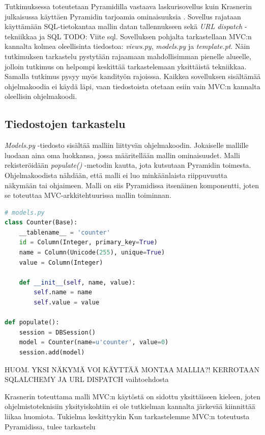 \documentclass[finnish,utf8,nonumbib,palatino,kandi]{gradu2}
\begin{document}
Tutkimuksessa toteutetaan Pyramidilla vastaava laskurisovellus kuin Krasnerin julkaisussa käyttäen Pyramidin tarjoamia ominaisuuksia \cite{Krasner:desc}. Sovellus rajataan käyttämään SQL-tietokantaa mallin datan tallennukseen sekä \emph{URL dispatch} -tekniikkaa \cite{urldispatch} ja SQL TODO: Viite sql. Sovelluksen pohjalta tarkastellaan MVC:n kannalta kolmea oleellisinta tiedostoa: \emph{views.py}, \emph{models.py} ja \emph{template.pt}. Näin tutkimuksen tarkastelu pystytään rajaamaan mahdollisimman pienelle alueelle, jolloin tutkimus on helpompi keskittää tarkastelemaan yksittäistä tekniikkaa. Samalla tutkimus pysyy myös kandityön rajoisssa. Kaikkea sovelluksen sisältämää ohjelmakoodia ei käydä läpi, vaan tiedostoista otetaan esiin vain MVC:n kannalta oleellisin ohjelmakoodi. 


\subsection{Tiedostojen tarkastelu}

\emph{Models.py} -tiedosto sisältää malliin liittyvän ohjelmakoodin. Jokaiselle mallille luodaan aina oma luokkansa, jossa määritellään mallin ominaisuudet. Malli rekisteröidään \emph{populate()} -metodin kautta, jota kutsutaan Pyramidin toimesta.
Ohjelmakoodista nähdään, että malli ei luo minkäänlaista riippuvuutta näkymään tai ohjaimeen. Malli on siis Pyramidissa itsenäinen komponentti, joten se toteuttaa MVC-arkkitehtuurissa
mallin toiminnan. 
\begin{lstlisting}[language=Python]
# models.py
class Counter(Base):
    __tablename__ = 'counter'
    id = Column(Integer, primary_key=True)
    name = Column(Unicode(255), unique=True)
    value = Column(Integer)

    def __init__(self, name, value):
        self.name = name
        self.value = value

def populate():
    session = DBSession()
    model = Counter(name=u'counter', value=0)
    session.add(model)
\end{lstlisting} 


HUOM. YKSI NÄKYMÄ VOI KÄYTTÄÄ MONTAA MALLIA?!
KERROTAAN SQLALCHEMY JA URL DISPATCH vaihtoehdosta

 Krasnerin toteuttama malli MVC:n käytöstä on sidottu yksittäiseen kieleen, joten ohjelmistoteknisiin yksityiskohtiin ei ole tutkielman kannalta järkevää kiinnittää liikaa huomiota.
Tukielma keskittyykin
 Kun tarkastelemme MVC:n toteutusta Pyramidissa, tulee tarkastelu
\end{document}
